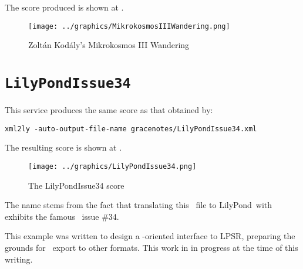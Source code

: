 The score produced is shown at .
\begin{figure}[htbp]
\begin{center}
\texttt{[image: ../graphics/MikrokosmosIIIWandering.png]}
\caption{Zoltán Kodály's Mikrokosmos III Wandering}
\label{Zoltán Kodály's Mikrokosmos III Wandering}
\end{center}
\end{figure}


\section{{\tt LilyPondIssue34}}

This service produces the same score as that obtained by:
\begin{lstlisting}[language=CPlusPlus]
xml2ly -auto-output-file-name gracenotes/LilyPondIssue34.xml
\end{lstlisting}

The resulting score is shown at .
\begin{figure}[htbp]
\begin{center}
\texttt{[image: ../graphics/LilyPondIssue34.png]}
\caption{The LilyPondIssue34 score}
\label{The LilyPondIssue34 score}
\end{center}
\end{figure}

The name  stems from the fact that translating this \mxml\ file to LilyPond\ with \fileName{\mxmlToLy} exhibits the famous \lily\ issue \#34.

This example was written to design a \lily-oriented interface to LPSR, preparing the grounds for \lily\ export to other formats. This work in in progress at the time of this writing.

